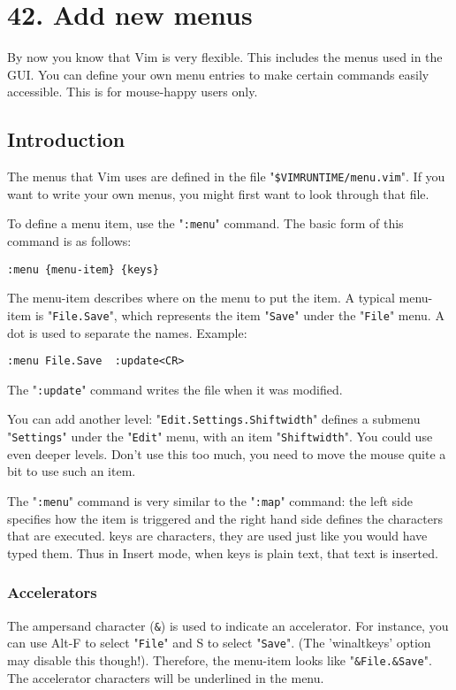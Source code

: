 \section{42. Add new menus}
By now you know that Vim is very flexible.
This includes the menus used in the GUI.
You can define your own menu entries to make certain commands easily accessible.
This is for mouse-happy users only.
\subsection{Introduction}
The menus that Vim uses are defined in the file "\verb!$VIMRUNTIME/menu.vim!".
If you want to write your own menus, you might first want to look through that file.

To define a menu item, use the "\verb!:menu!" command.
The basic form of this command is as follows:

\begin{Verbatim}[samepage=true]
 :menu {menu-item} {keys}
\end{Verbatim}

The {menu-item} describes where on the menu to put the item.
A typical {menu-item} is "\verb!File.Save!", which represents the item "\verb!Save!" under the "\verb!File!" menu.
A dot is used to separate the names.
Example:

\begin{Verbatim}[samepage=true]
 :menu File.Save  :update<CR>
\end{Verbatim}

The "\verb!:update!" command writes the file when it was modified.

You can add another level: "\verb!Edit.Settings.Shiftwidth!" defines a submenu "\verb!Settings!" under the "\verb!Edit!" menu, with an item "\verb!Shiftwidth!".
You could use even deeper levels.
Don't use this too much, you need to move the mouse quite a bit to use such an item.

The "\verb!:menu!" command is very similar to the "\verb!:map!" command: the left side specifies how the item is triggered and the right hand side defines the characters that are executed.
{keys} are characters, they are used just like you would have typed them.
Thus in Insert mode, when {keys} is plain text, that text is inserted.

\subsubsection{Accelerators}
The ampersand character (\verb!&!) is used to indicate an accelerator.
For instance, you can use Alt-F to select "\verb!File!" and S to select "\verb!Save!".
(The 'winaltkeys' option may disable this though!).
Therefore, the {menu-item} looks like "\verb!&File.&Save!".
The accelerator characters will be underlined in the menu.

